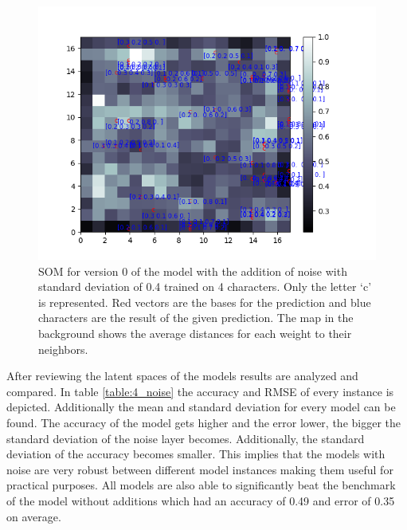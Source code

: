 \begin{figure}[!htb]
	\centering
	\includegraphics[width=\textwidth]{images/SOM_graphics/17x17_4d_noise_04_v0/c.png}
	\caption{SOM for version 0 of the model with the addition of noise with standard deviation of 0.4 trained on 4 characters. Only the letter `c' is represented. Red vectors are the bases for the prediction and blue characters are the result of the given prediction. The map in the background shows the average distances for each weight to their neighbors.}
	\label{fig:4d_noise_04_c}
\end{figure}

After reviewing the latent spaces of the models results are analyzed and compared. In table \ref{table:4_noise} the accuracy and RMSE of every instance is depicted. Additionally the mean and standard deviation for every model can be found. The accuracy of the model gets higher and the error lower, the bigger the standard deviation of the noise layer becomes. Additionally, the standard deviation of the accuracy becomes smaller. This implies that the models with noise are very robust between different model instances making them useful for practical purposes. All models are also able to significantly beat the benchmark of the model without additions which had an accuracy of 0.49 and error of 0.35 on average. 

